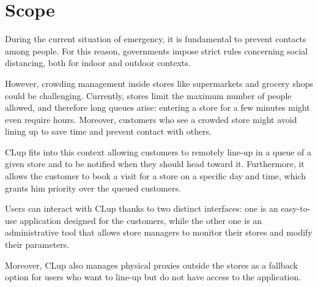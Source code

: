 \documentclass[a4paper,oneside,11pt]{book}
\begin{document}
    \section{Scope}
    During the current situation of emergency, it is fundamental to prevent contacts among people. For this reason, governments impose strict rules concerning social distancing, both for indoor and outdoor contexts. \par
    However, crowding management inside stores like supermarkets and grocery shops could be challenging. Currently, stores limit the maximum number of people allowed, and therefore long queues arise: entering a store for a few minutes might even require hours. Moreover, customers who see a crowded store might avoid lining up to save time and prevent contact with others. \par
    CLup fits into this context allowing customers to remotely line-up in a queue of a given store and to be notified when they should head toward it. Furthermore, it allows the customer to book a visit for a store on a specific day and time, which grants him priority over the queued customers. \par
    Users can interact with CLup thanks to two distinct interfaces: one is an easy-to-use application designed for the customers, while the other one is an administrative tool that allows store managers to monitor their stores and modify their parameters. \par
    Moreover, CLup also manages physical proxies outside the stores as a fallback option for users who want to line-up but do not have access to the application.
\end{document}
